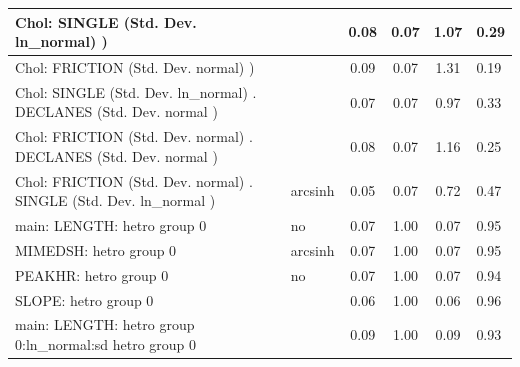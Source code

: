 \begin{table}
\begin{center}
\begin{tabular}{|l|l|c|c|c|l|}
			\hline
			 Chol: SINGLE (Std. Dev. ln_normal) ) &  & 0.08 & 0.07 & 1.07 & 0.29 \\
			\hline
			 Chol: FRICTION (Std. Dev. normal) ) &  & 0.09 & 0.07 & 1.31 & 0.19 \\
			\hline
			 Chol: SINGLE (Std. Dev. ln_normal) . DECLANES (Std. Dev.   normal ) &  & 0.07 & 0.07 & 0.97 & 0.33 \\
			\hline
			 Chol: FRICTION (Std. Dev. normal) . DECLANES (Std. Dev.   normal ) &  & 0.08 & 0.07 & 1.16 & 0.25 \\
			\hline
			 Chol: FRICTION (Std. Dev. normal) . SINGLE (Std. Dev.   ln_normal ) & arcsinh & 0.05 & 0.07 & 0.72 & 0.47 \\
			\hline
			main: LENGTH: hetro group 0 & no & 0.07 & 1.00 & 0.07 & 0.95 \\
			\hline
			MIMEDSH: hetro group 0 & arcsinh & 0.07 & 1.00 & 0.07 & 0.95 \\
			\hline
			PEAKHR: hetro group 0 & no & 0.07 & 1.00 & 0.07 & 0.94 \\
			\hline
			SLOPE: hetro group 0 &  & 0.06 & 1.00 & 0.06 & 0.96 \\
			\hline
			main: LENGTH: hetro group 0:ln_normal:sd  hetro group 0 &  & 0.09 & 1.00 & 0.09 & 0.93 \\
			\hline
		\end{tabular}
	\end{center}
\end{table}